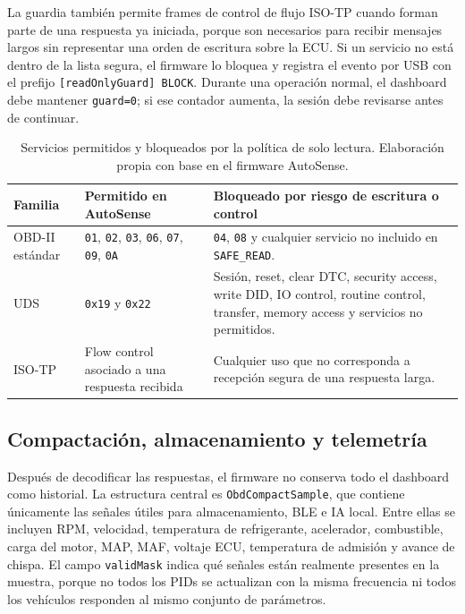 \documentclass[12pt,letterpaper]{report}
\begin{document}
La guardia también permite frames de control de flujo ISO-TP cuando forman parte de una respuesta ya iniciada, porque son necesarios para recibir mensajes largos sin representar una orden de escritura sobre la ECU. Si un servicio no está dentro de la lista segura, el firmware lo bloquea y registra el evento por USB con el prefijo \texttt{[readOnlyGuard] BLOCK}. Durante una operación normal, el dashboard debe mantener \texttt{guard=0}; si ese contador aumenta, la sesión debe revisarse antes de continuar.

\begin{table}[!htbp]
\centering
\caption{Servicios permitidos y bloqueados por la política de solo lectura. Elaboración propia con base en el firmware AutoSense.}
\label{tab:firmware-solo-lectura}
\renewcommand{\arraystretch}{1.08}
\setlength{\tabcolsep}{5pt}
\small
\begin{tabular}{@{}p{}p{}p{}@{}}
\toprule
Familia & Permitido en AutoSense & Bloqueado por riesgo de escritura o control \\
\midrule
OBD-II estándar & \texttt{01}, \texttt{02}, \texttt{03}, \texttt{06}, \texttt{07}, \texttt{09}, \texttt{0A} & \texttt{04}, \texttt{08} y cualquier servicio no incluido en \texttt{SAFE\_READ}. \\
UDS & \texttt{0x19} y \texttt{0x22} & Sesión, reset, clear DTC, security access, write DID, IO control, routine control, transfer, memory access y servicios no permitidos. \\
ISO-TP & Flow control asociado a una respuesta recibida & Cualquier uso que no corresponda a recepción segura de una respuesta larga. \\
\bottomrule
\end{tabular}
\end{table}

\subsection{Compactación, almacenamiento y telemetría}

Después de decodificar las respuestas, el firmware no conserva todo el dashboard como historial. La estructura central es \texttt{ObdCompactSample}, que contiene únicamente las señales útiles para almacenamiento, BLE e IA local. Entre ellas se incluyen RPM, velocidad, temperatura de refrigerante, acelerador, combustible, carga del motor, MAP, MAF, voltaje ECU, temperatura de admisión y avance de chispa. El campo \texttt{validMask} indica qué señales están realmente presentes en la muestra, porque no todos los PIDs se actualizan con la misma frecuencia ni todos los vehículos responden al mismo conjunto de parámetros.
\end{document}
